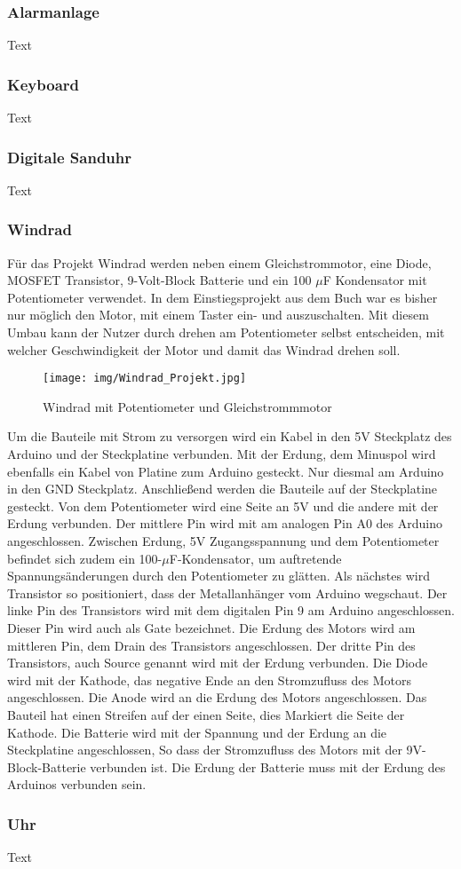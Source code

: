 \subsubsection{Alarmanlage}
Text

\subsubsection{Keyboard}
Text

\subsubsection{Digitale Sanduhr}
Text

\subsubsection{Windrad}

Für das Projekt Windrad werden neben einem Gleichstrommotor, eine Diode, MOSFET Transistor, 9-Volt-Block Batterie und ein 100 $\mu$F Kondensator mit Potentiometer verwendet. In dem Einstiegsprojekt aus dem Buch war es bisher nur möglich den Motor, mit einem Taster ein- und auszuschalten. Mit diesem Umbau kann der Nutzer durch drehen am Potentiometer selbst entscheiden, mit welcher Geschwindigkeit der Motor und damit das Windrad drehen soll.
\\

\begin{figure}[h]
\begin{center}
\texttt{[image: img/Windrad\_Projekt.jpg]}
\caption{Windrad mit Potentiometer und Gleichstrommmotor}
\label{Windrad_project}
\end{center}
\end{figure}
Um die Bauteile mit Strom zu versorgen wird ein Kabel in den 5V Steckplatz des Arduino und der Steckplatine verbunden. Mit der Erdung, dem Minuspol wird ebenfalls ein Kabel von Platine zum Arduino gesteckt. Nur diesmal am Arduino in den GND Steckplatz. Anschließend werden die Bauteile auf der Steckplatine gesteckt. Von dem Potentiometer wird eine Seite an 5V und die andere mit der Erdung verbunden. Der mittlere Pin wird mit am analogen Pin A0 des Arduino angeschlossen. Zwischen Erdung, 5V Zugangsspannung und dem Potentiometer befindet sich zudem ein 100-$\mu$F-Kondensator, um auftretende Spannungsänderungen durch den Potentiometer zu glätten. Als nächstes wird Transistor so positioniert, dass der Metallanhänger vom Arduino wegschaut. Der linke Pin des Transistors wird mit dem digitalen Pin 9 am Arduino angeschlossen. Dieser Pin wird auch als Gate bezeichnet. Die Erdung des Motors wird am mittleren Pin, dem Drain des Transistors angeschlossen. Der dritte Pin des Transistors, auch Source genannt wird mit der Erdung verbunden. Die Diode wird mit der Kathode, das negative Ende an den Stromzufluss des Motors angeschlossen. Die Anode wird an die Erdung des Motors angeschlossen. Das Bauteil hat einen Streifen auf der einen Seite, dies Markiert die Seite der Kathode. Die Batterie wird mit der Spannung und der Erdung an die Steckplatine angeschlossen, So dass der Stromzufluss des Motors mit der 9V-Block-Batterie verbunden ist. Die Erdung der Batterie muss mit der Erdung des Arduinos verbunden sein.


\subsubsection{Uhr}
Text